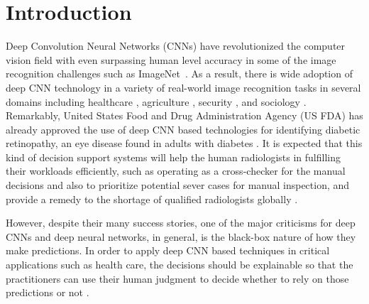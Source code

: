 \section{Introduction}
Deep Convolution Neural Networks (CNNs) \cite{alexnet, vggnet, resnet, inception} have revolutionized the computer vision field with even surpassing human level accuracy in some of the image recognition challenges such as ImageNet~\cite{imagenet}.
As a result, there is wide adoption of deep CNN technology in a variety of real-world image recognition tasks in several domains including healthcare \cite{kermany2018identifying, islam2017abnormality}, agriculture \cite{mohanty2016using}, security \cite{arbabzadah2016identifying}, and sociology \cite{wang2017deep}.
Remarkably, United States Food and Drug Administration Agency (US FDA) has already approved the use of deep CNN based technologies for identifying diabetic retinopathy, an eye disease found in adults with diabetes \cite{fdaretinopathy}.
It is expected that this kind of decision support systems will help the human radiologists in fulfilling their workloads efficiently, such as operating as a cross-checker for the manual decisions and also to prioritize potential sever cases for manual inspection, and provide a remedy to the shortage of qualified radiologists globally \cite{radiologistshortage}.

However, despite their many success stories, one of the major criticisms for deep CNNs and deep neural networks, in general, is the black-box nature of how they make predictions.
In order to apply deep CNN based techniques in critical applications such as health care, the decisions should be explainable so that the practitioners can use their human judgment to decide whether to rely on those predictions or not \cite{jung2017deep}.

